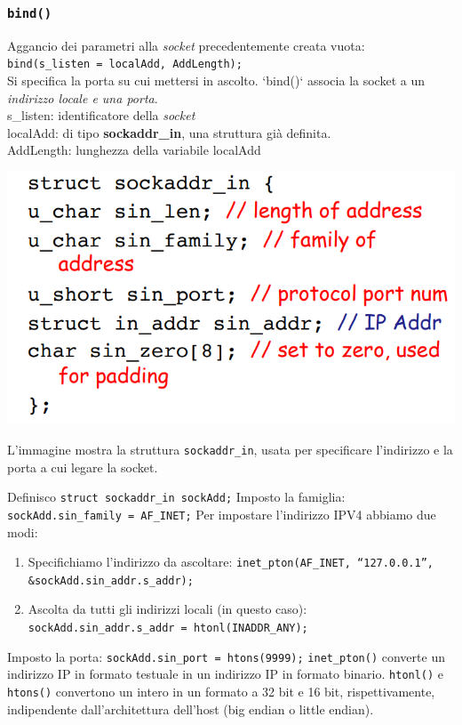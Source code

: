 \subsubsection*{\texttt{bind()}}
Aggancio dei parametri alla \textit{socket} precedentemente creata vuota: \\
\texttt{bind(s\_listen = localAdd, AddLength);} \\
Si specifica la porta su cui mettersi in ascolto. `bind()` associa la socket a un \textit{indirizzo locale e una porta}. \\
s\_listen: identificatore della \textit{socket} \\
localAdd: di tipo \textbf{sockaddr\_in}, una struttura già definita. \\
AddLength: lunghezza della variabile localAdd \\
\begin{center}
\includegraphics[width=\textwidth]{./img/struct_sockaddr_In.png}
\end{center}
L'immagine mostra la struttura \texttt{sockaddr\_in}, usata per specificare l'indirizzo e la porta a cui legare la socket.

Definisco \texttt{struct sockaddr\_in sockAdd;}
Imposto la famiglia: \texttt{sockAdd.sin\_family = AF\_INET;}
Per impostare l'indirizzo IPV4 abbiamo due modi:
\begin{enumerate}
  \item Specifichiamo l'indirizzo da ascoltare: \texttt{inet\_pton(AF\_INET, “127.0.0.1”, \&sockAdd.sin\_addr.s\_addr);}
  \item Ascolta da tutti gli indirizzi locali (in questo caso): \texttt{sockAdd.sin\_addr.s\_addr = htonl(INADDR\_ANY);}
\end{enumerate}
Imposto la porta: \texttt{sockAdd.sin\_port = htons(9999);}
\texttt{inet\_pton()} converte un indirizzo IP in formato testuale in un indirizzo IP in formato binario.
\texttt{htonl()} e \texttt{htons()} convertono un intero in un formato a 32 bit e 16 bit, rispettivamente, indipendente dall'architettura dell'host (big endian o little endian).

